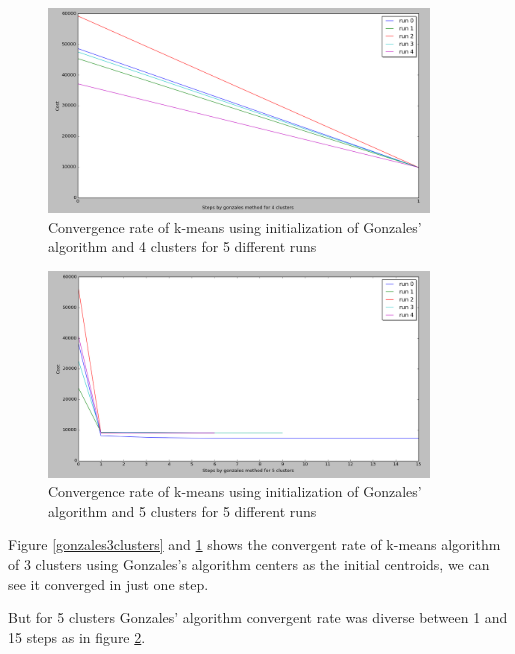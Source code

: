 \begin{figure}[!htb]
\centering
\includegraphics[width=0.9\textwidth]{shots/gonzales4clusters.png}
\caption{Convergence rate of k-means using initialization of Gonzales' algorithm and 4 clusters for 5 different runs  }
\label{gonzales4clusters}
\end{figure}

\begin{figure}[!htb]
\centering
\includegraphics[width=0.9\textwidth]{shots/gonzales5clusters.png}
\caption{ Convergence rate of k-means using initialization of Gonzales' algorithm and 5 clusters for 5 different runs }
\label{gonzales5clusters}
\end{figure}

Figure \ref{gonzales3clusters} and \ref{gonzales4clusters} shows the convergent rate of k-means algorithm of 3 clusters using Gonzales's algorithm centers as the initial centroids, we can see it converged in just one step.

But for 5 clusters Gonzales' algorithm convergent rate was diverse between 1 and 15 steps as in figure \ref{gonzales5clusters}.

